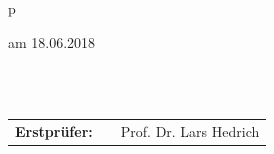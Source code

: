 \begin{center}
\begin{tabular}{p{\textwidth}}
\begin{center}
\large{am 18.06.2018}
\end{center}

\\

\\

\begin{center}
\begin{tabular}{lll}
\textbf{Erstprüfer:} & & Prof. Dr. Lars Hedrich\\
\end{tabular}
\end{center}

\end{tabular}
\end{center}